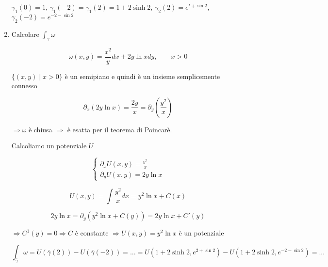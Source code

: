 \begin{exbar}
\begin{example}
\begin{enumerate}
		$\gamma_1(0)=1$, $\gamma_1(-2)=\gamma_1(2)=1+2\sinh 2$, $\gamma_2(2)=e^{t+\sin 2}$, $\gamma_2(-2)=e^{-2-\sin 2}$
		
		\item Calcolare $\int_{\overline{\gamma}}\omega $
		
		$$\omega(x,y)=\frac{x^2}{y}dx+2y \ln x dy, \qquad x >0$$
		
		$\{(x,y)\mid x>0\}$ è un semipiano e quindi è un insieme semplicemente connesso
		
		$$\partial_x(2y\ln x)=\frac{2y}{x}=\partial_y (\frac{y^2}{x})$$
		
		$\Rightarrow \omega$ è chiusa $\Rightarrow$ è esatta per il teorema di Poincarè.
		
		Calcoliamo un potenziale $U$
		
		$$\begin{cases}
			\partial_x U (x,y)=\frac{y^2}{x}\\
			\partial_yU(x,y)= 2y\ln x
		\end{cases}$$
		
		$$U(x,y)=\int \frac{y^2}{x}dx=y^2\ln x + C(x)$$
		
		$$2y\ln x = \partial_y(y^2\ln x + C(y))=2y\ln x + C'(y)$$
		
		$\Rightarrow C^1 (y)=0 \Rightarrow C$ è constante $\Rightarrow U(x,y)=y^2\ln x$ è un potenziale
		
		$$\int_{\overline{\gamma}}\omega =U(\overline{\gamma}(2))-U(\overline{\gamma}(-2))=...= U(1+2\sinh 2, e^{2+\sin 2})-U(1+2\sinh 2, e^{-2-\sin 2})=...$$
	\end{enumerate}
\end{example}
\end{exbar}


